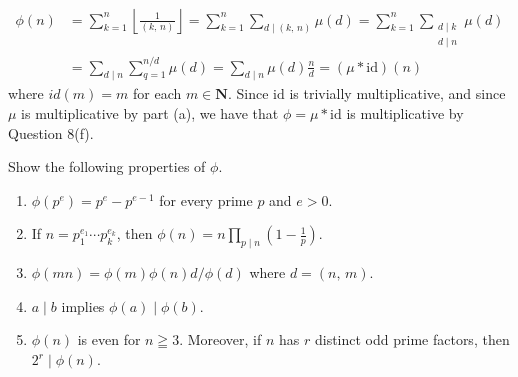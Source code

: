 \documentclass[a4paper,11pt]{article}
\theoremstyle{mythm}
\theoremstyle{mydef}
\newcommand{\N}{\mathbf{N}}
\begin{document}
{\begin{enumerate}[{\bf (a)}]
\begin{align*}
      \phi(n) &= \sum_{k=1}^n \left\lfloor \frac{1}{(k,\,n)} \right\rfloor
      = \sum_{k=1}^n\sum_{d \mid (k,\,n)}\mu(d)
      = \sum_{k=1}^n\sum_{\begin{smallmatrix}d \mid k \\ d \mid n\end{smallmatrix}}\mu(d) \\
      &= \sum_{d \mid n}\sum_{q=1}^{n/d}\mu(d)
      = \sum_{d \mid n}\mu(d)\frac{n}{d}
      = (\mu * \text{id})(n)
    \end{align*}
    where $id(m)=m$ for each $m \in \N$. Since $\text{id}$ is trivially
    multiplicative, and since $\mu$ is multiplicative by part (a), we have that
    $\phi = \mu * \text{id}$ is multiplicative by Question 8(f).
  \end{enumerate}
}

 Show the following properties of $\phi$.
\begin{enumerate}[{\bf (a)}]
\item $\phi(p^e)=p^e-p^{e-1}$ for every prime $p$ and $e>0$.
\item If $n=p_1^{e_1} \cdots p_k^{e_k}$, then $\phi(n)=n\prod_{p \mid
    n}(1-\frac{1}{p})$.
\item $\phi(mn)=\phi(m)\phi(n)d/\phi(d)$ where $d=(n,\,m)$.
\item $a \mid b$ implies $\phi(a) \mid \phi(b)$.
\item $\phi(n)$ is even for $n \geqq 3$. Moreover, if $n$ has $r$ distinct odd
  prime factors, then $2^r \mid \phi(n)$.
\end{enumerate}
\end{document}
